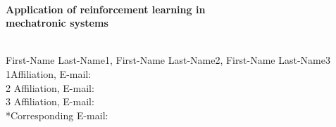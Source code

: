\documentclass[10pt,a4paper]{report}  %
\begin{document}
\begin{center}
\quad \\[1pt]
\fontsize{22pt}{3pt}\selectfont\hspace{0.35cm}\textbf{\sectionef Application of reinforcement
 learning in \\[12pt]
 mechatronic systems}\\[12pt]
\end{center}
\begin{center}
\qquad \\[27pt]
First-Name Last-Name1, First-Name Last-Name2, First-Name Last-Name3\\[12pt]
1Affiliation, E-mail:\\[12pt]
2 Affiliation, E-mail:\\[12pt]
3 Affiliation, E-mail:\\[12pt]
*Corresponding E-mail: \\
\qquad \\
\end{center}
\fontsize{10pt}{13pt}\selectfont




\end{document}
